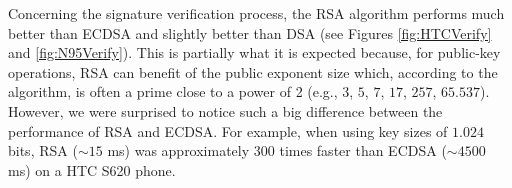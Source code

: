 \documentclass[authoryear]{elsarticle}
\begin{document}



Concerning the signature verification process, the RSA algorithm performs much better than ECDSA and slightly better than DSA (see Figures \ref{fig:HTCVerify} and \ref{fig:N95Verify}). This is partially what it is expected because, for public-key operations, RSA can benefit of the public exponent size which, according to the algorithm, is often a prime close to a power of 2 (e.g., $3$, $5$, $7$, $17$, $257$, $65.537$). However, we were surprised to notice such a big difference between the performance of RSA and ECDSA. For example, when using key sizes of $1.024$ bits, RSA ($\sim15$ ms) was approximately $300$ times faster than ECDSA ($\sim4500$ ms) on a HTC S620 phone.
\end{document}
